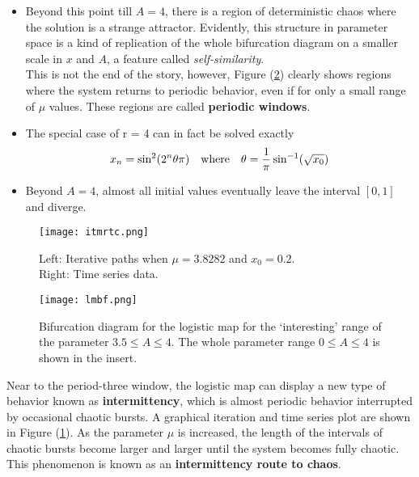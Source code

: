 \begin{itemize}
	\item Beyond this point till $A=4$, there is a region of deterministic chaos where the solution is a strange attractor.
	Evidently, this structure in parameter space is a kind of replication of the whole bifurcation diagram on a smaller scale in $x$ and $A$, a feature called \emph{self-similarity}.\\
	This is not the end of the story, however, Figure (\ref{fig:lmbf}) clearly shows regions where the system returns to periodic behavior, even if for only a small range of $\mu$ values.
	These regions are called \textbf{periodic windows}.
	\item The special case of r = 4 can in fact be solved exactly
	\begin{equation}
		x_n=\sin^2(2^n\theta\pi)\quad\text{where}\quad\theta=\frac{1}{\pi}\sin^{-1}(\sqrt{x_0})
	\end{equation}
	\item Beyond $A=4$, almost all initial values eventually leave the interval $[0,1]$ and diverge.
\end{itemize}
\begin{figure}[h!]
	\centering
	\texttt{[image: itmrtc.png]}
	\caption{Left: Iterative paths when $\mu=3.8282$ and $x_0=0.2$.\\Right: Time series data.}
	\label{fig:itmrtc}
\end{figure}
\begin{figure}[h!]
	\centering
	\texttt{[image: lmbf.png]}
	\caption{Bifurcation diagram for the logistic map for the ‘interesting’ range of the parameter $3.5\leq A\leq4$. The whole parameter range $0\leq A\leq4$ is shown in the insert.}
	\label{fig:lmbf}
\end{figure}
Near to the period-three window, the logistic map can display a new type of behavior known as \textbf{intermittency}, which is almost periodic behavior interrupted by occasional chaotic bursts.
A graphical iteration and time series plot are shown in Figure (\ref{fig:itmrtc}).
As the parameter $\mu$ is increased, the length of the intervals of chaotic bursts become larger and larger until the system becomes fully chaotic.
This phenomenon is known as an \textbf{intermittency route to chaos}.